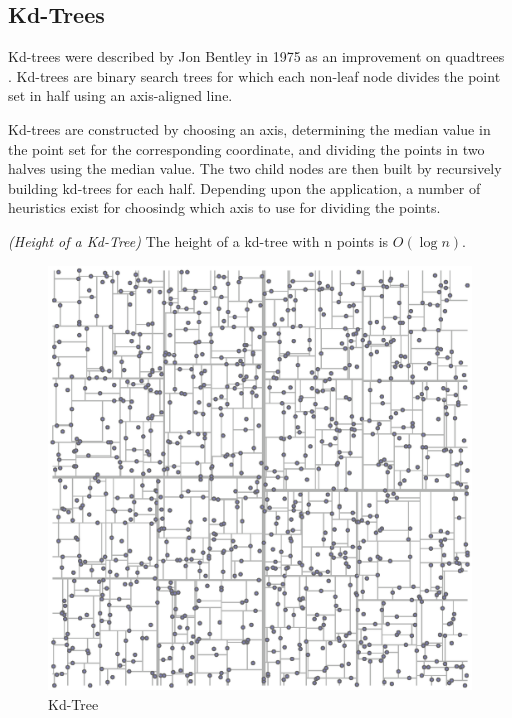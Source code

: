 \documentclass[mcs]{scsthesis}
\begin{document}
\subsection{Kd-Trees}

Kd-trees were described by Jon Bentley in 1975 as an improvement on quadtrees
\cite{kdtree}.  Kd-trees are binary search trees for which each non-leaf node
divides the point set in half using an axis-aligned line.

Kd-trees are constructed by choosing an axis, determining the median value in
the point set for the corresponding coordinate, and dividing the points in two
halves using the median value.  The two child nodes are then built by
recursively building kd-trees for each half.  Depending upon the application,
a number of heuristics exist for choosindg which axis to use for dividing the
points.

\begin{thm} \emph{(Height of a Kd-Tree)}
The height of a kd-tree with n points is \(O(\log n)\).
\end{thm}

\begin{figure}
\begin{center}
\includegraphics[scale=0.35]{diagrams/kdtree.eps}
\caption{Kd-Tree}
\end{center}
\end{figure}
\end{document}
